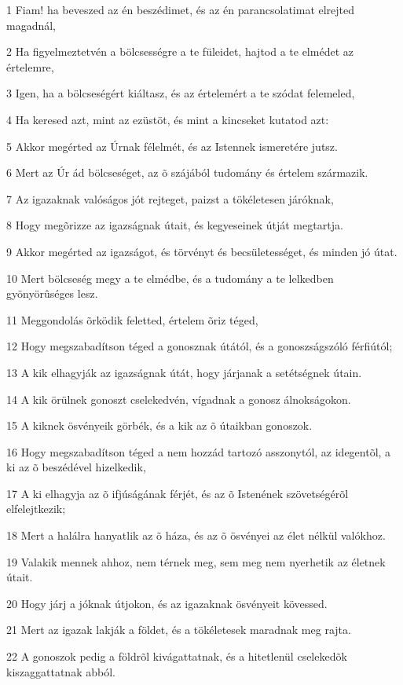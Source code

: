 \par 1 Fiam! ha beveszed az én beszédimet, és az én parancsolatimat elrejted magadnál,
\par 2 Ha figyelmeztetvén a bölcsességre a te füleidet, hajtod a te elmédet az értelemre,
\par 3 Igen, ha a bölcseségért kiáltasz, és az értelemért a te szódat felemeled,
\par 4 Ha keresed azt, mint az ezüstöt, és mint a kincseket kutatod azt:
\par 5 Akkor megérted az Úrnak félelmét, és az Istennek ismeretére jutsz.
\par 6 Mert az Úr ád bölcseséget, az õ szájából tudomány és értelem származik.
\par 7 Az igazaknak valóságos jót rejteget, paizst a tökéletesen járóknak,
\par 8 Hogy megõrizze az igazságnak útait, és kegyeseinek útját megtartja.
\par 9 Akkor megérted az igazságot, és törvényt és becsületességet, és minden jó útat.
\par 10 Mert bölcseség megy a te elmédbe, és a tudomány a te lelkedben gyönyörûséges lesz.
\par 11 Meggondolás õrködik feletted, értelem õriz téged,
\par 12 Hogy megszabadítson téged a gonosznak útától, és a gonoszságszóló férfiútól;
\par 13 A kik elhagyják az igazságnak útát, hogy járjanak a setétségnek útain.
\par 14 A kik örülnek gonoszt cselekedvén, vígadnak a gonosz álnokságokon.
\par 15 A kiknek ösvényeik görbék, és a kik az õ útaikban gonoszok.
\par 16 Hogy megszabadítson téged a nem hozzád tartozó asszonytól, az idegentõl, a ki az õ beszédével  hizelkedik,
\par 17 A ki elhagyja az õ ifjúságának férjét, és az õ Istenének szövetségérõl elfelejtkezik;
\par 18 Mert a halálra hanyatlik az õ háza, és az õ ösvényei az élet nélkül valókhoz.
\par 19 Valakik mennek ahhoz, nem térnek meg, sem meg nem nyerhetik az életnek útait.
\par 20 Hogy járj a jóknak útjokon, és az igazaknak ösvényeit kövessed.
\par 21 Mert az igazak lakják a földet, és a tökéletesek maradnak meg rajta.
\par 22 A gonoszok pedig a földrõl kivágattatnak, és a hitetlenül cselekedõk kiszaggattatnak abból.

